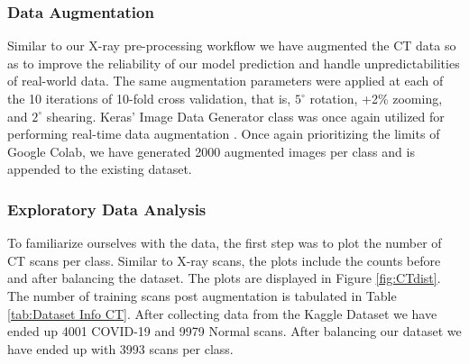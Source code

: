 \subsubsection{Data Augmentation}

Similar to our X-ray pre-processing workflow we have augmented the CT data so as to improve the reliability of our model prediction and handle unpredictabilities of real-world data. The same augmentation parameters were applied at each of the 10 iterations of 10-fold cross validation, that is, $5^{\circ}$ rotation, +2\% zooming, and $2^{\circ}$ shearing. Keras' Image Data Generator class was once again utilized for performing real-time data augmentation \cite{KER}. Once again prioritizing the limits of Google Colab, we have generated 2000 augmented images per class and is appended to the existing dataset.

\subsubsection{Exploratory Data Analysis} \label{EDA CT}

To familiarize ourselves with the data, the first step was to plot the number of CT scans per class. Similar to X-ray scans, the plots include the counts before and after balancing the dataset. The plots are displayed in Figure \ref{fig:CTdist}. The number of training scans post augmentation is tabulated in Table \ref{tab:Dataset Info CT}. After collecting data from the Kaggle Dataset we have ended up 4001 COVID-19 and 9979 Normal scans. After balancing our dataset we have ended up with 3993 scans per class.

